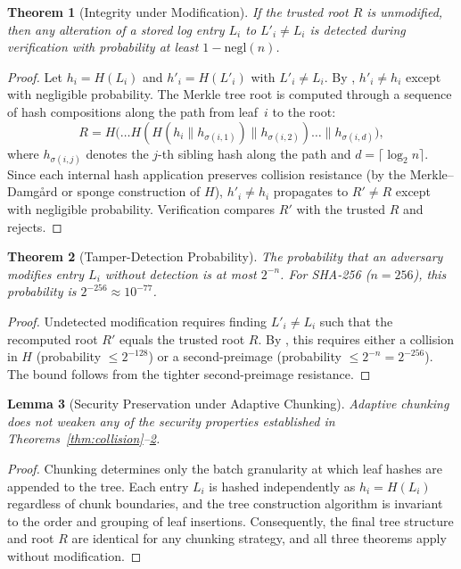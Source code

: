 \documentclass[preprint,12pt]{elsarticle}
\newtheorem{theorem}{Theorem}
\newtheorem{lemma}[theorem]{Lemma}
\begin{document}
\begin{theorem}[Integrity under Modification]
\label{thm:integrity}
If the trusted root $R$ is unmodified, then any alteration of a stored log entry $L_i$ to $L'_i \neq L_i$ is detected during verification with probability at least $1 - \mathrm{negl}(n)$.
\end{theorem}
\begin{proof}
Let $h_i = H(L_i)$ and $h'_i = H(L'_i)$ with $L'_i \neq L_i$.
By , $h'_i \neq h_i$ except with negligible probability.
The Merkle tree root is computed through a sequence of hash compositions along the path from leaf~$i$ to the root:
\[
  R = H\bigl(\ldots H(H(h_i \| h_{\sigma(i,1)}) \| h_{\sigma(i,2)}) \ldots \| h_{\sigma(i,d)}\bigr),
\]
where $h_{\sigma(i,j)}$ denotes the $j$-th sibling hash along the path and $d = \lceil \log_2 n \rceil$.
Since each internal hash application preserves collision resistance (by the Merkle--Damg\aa{}rd or sponge construction of $H$), $h'_i \neq h_i$ propagates to $R' \neq R$ except with negligible probability.
Verification compares $R'$ with the trusted $R$ and rejects.
\end{proof}

\begin{theorem}[Tamper-Detection Probability]
\label{thm:detection}
The probability that an adversary modifies entry $L_i$ without detection is at most $2^{-n}$.
For SHA-256 ($n = 256$), this probability is $2^{-256} \approx 10^{-77}$.
\end{theorem}
\begin{proof}
Undetected modification requires finding $L'_i \neq L_i$ such that the recomputed root $R'$ equals the trusted root $R$.
By , this requires either a collision in $H$ (probability $\le 2^{-128}$) or a second-preimage (probability $\le 2^{-n} = 2^{-256}$).
The bound follows from the tighter second-preimage resistance.
\end{proof}

\begin{lemma}[Security Preservation under Adaptive Chunking]
\label{lem:chunking}
Adaptive chunking does not weaken any of the security properties established in Theorems~\ref{thm:collision}--\ref{thm:detection}.
\end{lemma}
\begin{proof}
Chunking determines only the batch granularity at which leaf hashes are appended to the tree.
Each entry $L_i$ is hashed independently as $h_i = H(L_i)$ regardless of chunk boundaries, and the tree construction algorithm is invariant to the order and grouping of leaf insertions.
Consequently, the final tree structure and root $R$ are identical for any chunking strategy, and all three theorems apply without modification.
\end{proof}
\end{document}
